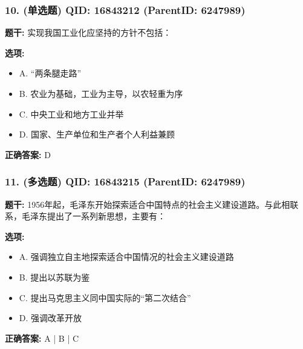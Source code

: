 \documentclass[12pt,UTF8]{ctexart}
\begin{document}
\subsubsection*{10. (单选题) \small QID: 16843212 (ParentID: 6247989)}

\textbf{题干:}
实现我国工业化应坚持的方针不包括：



\textbf{选项:}
\begin{itemize}[leftmargin=*]

  \item A. “两条腿走路”

  \item B. 农业为基础，工业为主导，以农轻重为序

  \item C. 中央工业和地方工业并举

  \item D. 国家、生产单位和生产者个人利益兼顾

\end{itemize}

\textbf{正确答案:}
D

\vspace{0.3em}\hrulefill\vspace{0.7em}

\subsubsection*{11. (多选题) \small QID: 16843215 (ParentID: 6247989)}

\textbf{题干:}
1956年起，毛泽东开始探索适合中国特点的社会主义建设道路。与此相联系，毛泽东提出了一系列新思想，主要有：



\textbf{选项:}
\begin{itemize}[leftmargin=*]

  \item A. 强调独立自主地探索适合中国情况的社会主义建设道路

  \item B. 提出以苏联为鉴

  \item C. 提出马克思主义同中国实际的“第二次结合”

  \item D. 强调改革开放

\end{itemize}

\textbf{正确答案:}
A | B | C

\vspace{0.3em}\hrulefill\vspace{0.7em}
\end{document}

